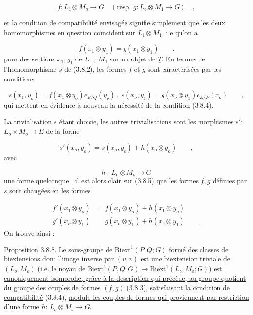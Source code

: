 \begin{equation}\tag{3.8.3}
f : L_1 \otimes M_o \longrightarrow G \quad (\text{resp. } g: L_o \otimes M_1 \longrightarrow G) \quad ,
\end{equation}

et la condition de compatibilité envisagée signifie simplement que les deux homomorphismes en question coïncident sur $L_1 \otimes M_1$, i.e qu'on a

\begin{equation}\tag{3.8.4}
f(x_1 \otimes y_1) = g(x_1 \otimes y_1) \qquad .
\end{equation}
pour des sections $x_1,y_1$ de $L_1$ , $M_1$ sur un objet de $\underline{T}$. En termes de l'homomorphisme $s$ de (3.8.2), les formes $f$ et $g$ sont caractérisées  par les conditions

\begin{equation}\tag{3.8.5}
s(x_1,y_o) = f(x_1 \otimes y_o) e_{E/Q}(y_o) \ , \ s(x_o,y_1) = g(x_o \otimes y_1) e_{E/P}(x_o) \qquad ,
\end{equation}
qui mettent en évidence à nouveau la nécessité de la condition (3.8.4).

La trivialisation $s$ étant choisie, les autres trivialisations sont les morphismes $s'$: $L_o \times M_o \longrightarrow E$ de la forme

\begin{equation}\tag{3.8.6}
s'(x_o,y_o) = s(x_o,y_o) + h(x_o \otimes y_o) \qquad ,
\end{equation}
avec

\begin{equation*}
h \ : \ L_o \otimes M_o \longrightarrow G
\end{equation*}
une forme quelconque ; il est alors clair sur (3.8.5) que les formes $f,g$ définies par $s$ sont changées en les formes

\begin{equation}\tag{3.8.7}
\begin{aligned}
f'(x_1 \otimes y_o) &= f(x_1 \otimes y_o) + h(x_1 \otimes y_o) \\
g'(x_o \otimes y_1) &= g(x_o \otimes y_1) + h(x_o \otimes y_1) \qquad .
\end{aligned}
\end{equation}
On trouve ainsi :

\underline{Proposition} 3.8.8. \underline{Le sous-groupe de} $\mathrm{Biext}^1(P,Q;G)$ \underline{formé des classes de biextensions dont l'image inverse par} $(u,v)$ \underline{est une biextension} \underline{triviale} \underline{de} $(L_o,M_o)$ (\underline{i}.\underline{e}. \underline{le noyau de} $\mathrm{Biext}^1(P,Q;G) \longrightarrow \mathrm{Biext}^1(L_o,M_o;G)$) \underline{est canoniquement isomorphe, grâce à la description qui précède, au groupe quotient}
\underline{du groupe des couples de formes} $(f,g)$ (3.8.3), \underline{satisfaisant la condition de compatibilité} (3.8.4), \underline{modulo les couples de formes qui proviennent par restriction d'une forme} $h$: $L_o \otimes M_o \longrightarrow G$.

